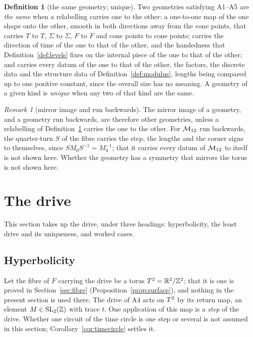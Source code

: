 \documentclass[11pt,a4paper]{article}
\theoremstyle{plain}
\theoremstyle{definition}
\newtheorem{definition}[theorem]{Definition}
\theoremstyle{remark}
\newtheorem{remark}[theorem]{Remark}
\begin{document}
\begin{definition}[the same geometry; unique]\label{def:same}
Two geometries satisfying A1--A5 are \emph{the same} when a relabelling carries one to the other: a one-to-one map of the one shape onto the other, smooth in both directions away from the cone points, that carries $T$ to $T$, $\Sigma$ to $\Sigma$, $F$ to $F$ and cone points to cone points; carries the direction of time of the one to that of the other, and the handedness that Definition~\ref{def:levels} fixes on the internal piece of the one to that of the other; and carries every datum of the one to that of the other, the factors, the discrete data and the structure data of Definition~\ref{def:modulus}, lengths being compared up to one positive constant, since the overall size has no meaning. A geometry of a given kind is \emph{unique} when any two of that kind are the same.
\end{definition}

\begin{remark}[mirror image and run backwards]\label{rem:mirror}
The mirror image of a geometry, and a geometry run backwards, are therefore other geometries, unless a relabelling of Definition~\ref{def:same} carries the one to the other. For $\mathcal{M}_{12}$ run backwards, the quarter-turn $S$ of the fibre carries the step, the lengths and the corner signs to themselves, since $SM_{0}S^{-1}=M_{0}^{-1}$; that it carries every datum of $\mathcal{M}_{12}$ to itself is not shown here. Whether the geometry has a symmetry that mirrors the torus is not shown here.
\end{remark}

\section{The drive}\label{sec:drive}

This section takes up the drive, under three headings: hyperbolicity, the least drive and its uniqueness, and worked cases.

\subsection{Hyperbolicity}

Let the fibre of $F$ carrying the drive be a torus $T^2=\mathbb{R}^{2}/\mathbb{Z}^{2}$; that it is one is proved in Section~\ref{sec:fibre} (Proposition~\ref{prop:surface}), and nothing in the present section is used there. The drive of A4 acts on $T^2$ by its return map, an element $M\in\mathrm{SL}_{2}(\mathbb{Z})$ with trace $t$. One application of this map is a \emph{step} of the drive. Whether one circuit of the time circle is one step or several is not assumed in this section; Corollary~\ref{cor:timecircle} settles it.
\end{document}
